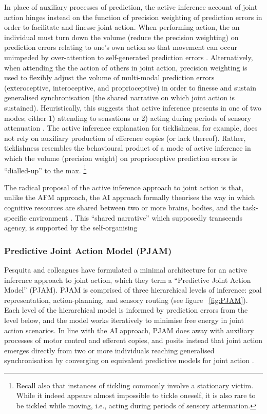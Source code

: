 \begin{CJK}{UTF8}{gbsn}
In place of auxiliary processes of prediction, the active inference account of joint action hinges instead on the function of precision weighting of prediction errors in order to facilitate and finesse joint action.  When performing action, the an individual must turn down the volume (reduce the precision weighting) on prediction errors relating to one's own action so that movement can occur unimpeded by over-attention to self-generated prediction errors \citep[an intuitive example of the opposite of this ideal scenario is when the flow of speech is interrupted due to the availability of exteroceptive auditory feedback in the case of a Skype call][]{Friston2015}. Alternatively, when attending the the action of others in joint action, precision weighting is used to flexibly adjust the volume of multi-modal prediction errors (exteroceptive, interoceptive, and proprioceptive) in order to finesse and sustain generalised synchronisation (the shared narrative on which joint action is sustained).  Heuristically, this suggests that active inference presents in one of two modes; either 1) attending to sensations or
2) acting during periods of sensory attenuation \citep{Friston2015}.  The active inference explanation for ticklishness, for example, does not rely on auxiliary production of efference copies (or lack thereof).  Rather, ticklishness resembles the behavioural product of a mode of active inference in which the volume (precision weight) on proprioceptive prediction errors is ``dialled-up'' to the max.
  \footnote{Recall also that instances of tickling commonly involve a stationary victim. While it indeed appears almost impossible to tickle oneself, it is also rare to be tickled while moving, i.e., acting during periods of sensory attenuation.}

The radical proposal of the active inference approach to joint action is that, unlike the AFM approach, the AI approach formally theorises the way in which cognitive resources are shared between two or more brains, bodies, and the task-specific environment \citep{Clark2015}.
This ``shared narrative'' which supposedly transcends agency, is supported by the self-organising


\subsubsection{Predictive Joint Action Model (PJAM)}
Pesquita and colleagues \textcite{Pesquita2017} have formulated a minimal architecture for an active inference approach to joint action, which they term a ``Predictive Joint Action Model'' (PJAM).  PJAM is comprised of three hierarchical levels of inference: goal representation, action-planning, and sensory routing (see figure ~\ref{fig:PJAM}).  Each level of the hierarchical model is informed by prediction errors from the level below, and the model works iteratively to minimise free energy in joint action scenarios.  In line with the AI approach, PJAM does away with auxiliary processes of motor control and efferent copies, and posits instead that joint action emerges directly from two or more individuals reaching generalised synchronisation by converging on equivalent predictive models for joint action \citep{Friston2015}.


\end{CJK}
